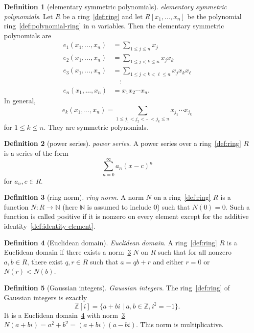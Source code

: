 \documentclass[12pt,a4paper]{article}
\theoremstyle{definition}
\newtheorem{definition}{Definition}
\begin{document}
\begin{definition}[elementary symmetric polynomials]\label{def:elementary-symmetric-polynomials}
\emph{elementary symmetric polynomials}. Let $R$ be a ring~\ref{def:ring} and let $R[x_1,\dots,x_n]$ be the polynomial ring~\ref{def:polynomial-ring} in $n$ variables. Then the elementary symmetric polynomials are 
$$\begin{align*}e_1(x_1,\dots,x_n) &= \sum_{1\leq j\leq n} x_j \\ e_2(x_1,\dots,x_n) &= \sum_{1\leq j < k \leq n} x_jx_k \\e_3(x_1,\dots, x_n) &=\sum_{1\leq j < k < \ell\leq n} x_jx_kx_\ell\\&\quad\vdots\\e_n(x_1,\dots,x_n) &= x_1x_2\cdots x_n.\end{align*}$$ In general, $$e_k(x_1,\dots,x_n) = \sum_{1\leq j_1<j_2<\cdots < j_k \leq n} x_{j_1}\cdots x_{j_k}$$ for $1\leq k\leq n$. They are symmetric polynomials.
\end{definition}

\begin{definition}[power series]\label{def:power-series}
\emph{power series}. A power series over a ring~\ref{def:ring} $R$ is a series of the form $$\sum_{n=0}^\infty a_n (x-c)^n$$ for $a_n, c\in R$.
\end{definition}

\begin{definition}[ring norm]\label{def:ring-norm}
\emph{ring norm}. A norm $N$ on a ring~\ref{def:ring} $R$ is a function $N: R\to \mathbb N$ (here $\mathbb N$ is assumed to include $0$) such that $N(0) = 0$. Such a function is called positive if it is nonzero on every element except for the additive identity~\ref{def:identity-element}.
\end{definition}

\begin{definition}[Euclidean domain]\label{def:euclidean-domain}
\emph{Euclidean domain}. A ring~\ref{def:ring} $R$ is a Euclidean domain if there exists a norm~\ref{def:ring-norm} $N$ on $R$ such that for all nonzero $a,b\in R$, there exist $q,r\in R$ such that $a = qb+r$ and either $r=0$ or $N(r) < N(b)$.
\end{definition}

\begin{definition}[Gaussian integers]\label{def:gaussian-integers}
\emph{Gaussian integers}. The ring~\ref{def:ring} of Gaussian integers is exactly $$\mathbb Z[i] = \{a+bi\mid a,b\in\mathbb Z, i^2=-1\}.$$
It is a Euclidean domain~\ref{def:euclidean-domain} with norm~\ref{def:ring-norm} $N(a+bi) = a^2+b^2 = (a+bi)(a-bi)$. This norm is multiplicative.
\end{definition}
\end{document}
